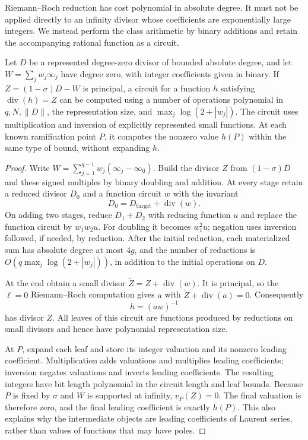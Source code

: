 Riemann--Roch reduction has cost polynomial in absolute degree.  It must
not be applied directly to an infinity divisor whose coefficients are
exponentially large integers.  We instead perform the class arithmetic
by binary additions and retain the accompanying rational function as a
circuit.

\begin{lemma}
\label{div:circuits}
Let $D$ be a represented degree-zero divisor of bounded absolute degree,
and let $W=\sum_jw_j\infty_j$ have degree zero, with integer coefficients
given in binary.  If
$Z=(1-\sigma)D-W$ is principal, a circuit for a function $h$ satisfying
$\operatorname{div}(h)=Z$ can be computed using a number of operations
polynomial in $q,N,\|D\|$, the representation size, and
$\max_j\log(2+|w_j|)$.  The circuit uses multiplication and inversion
of explicitly represented small functions.  At each known ramification
point $P$, it computes the nonzero value $h(P)$ within the same type of
bound, without expanding $h$.
\end{lemma}

\begin{proof}
Write $W=\sum_{j=1}^{q-1}w_j(\infty_j-\infty_0)$.  Build the divisor
$Z$ from $(1-\sigma)D$ and these signed multiples by binary doubling
and addition.  At every stage retain a reduced divisor $D_0$ and a
function circuit $w$ with the invariant
\begin{equation}\label{div:circuitinvariant}
 D_0=D_{\mathrm{target}}+\operatorname{div}(w).
\end{equation}
On adding two stages, reduce $D_1+D_2$ with reducing function $u$ and
replace the function circuit by $w_1w_2u$.  For doubling it becomes
$w_1^2u$; negation uses inversion followed, if needed, by reduction.
After the initial reduction, each materialized sum has absolute degree
at most $4g$, and the number of reductions is
$O(q\max_j\log(2+|w_j|))$, in addition to the initial operations on $D$.

At the end obtain a small divisor $\widetilde Z=Z+\operatorname{div}(w)$.
It is principal, so the $\ell=0$ Riemann--Roch computation gives $a$ with
$\widetilde Z+\operatorname{div}(a)=0$.  Consequently
\[
 h=(aw)^{-1}
\]
has divisor $Z$.  All leaves of this circuit are functions produced by
reductions on small divisors and hence have polynomial representation
size.

At $P$, expand each leaf and store its integer valuation and its nonzero
leading coefficient.  Multiplication adds valuations and multiplies
leading coefficients; inversion negates valuations and inverts leading
coefficients.  The resulting integers have bit length polynomial in the
circuit length and leaf bounds.  Because $P$ is fixed by $\sigma$ and
$W$ is supported at infinity, $v_P(Z)=0$.  The final valuation is
therefore zero, and the final leading coefficient is exactly $h(P)$.
This also explains why the intermediate objects are leading coefficients
of Laurent series, rather than values of functions that may have poles.
\end{proof}
